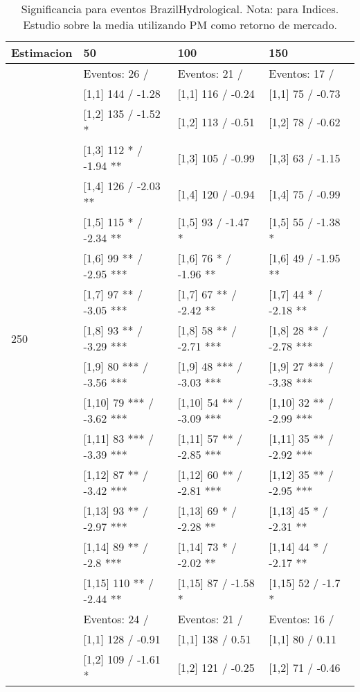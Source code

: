 \begin{table}

\caption{Significancia para eventos BrazilHydrological. Nota: para Indices. Estudio sobre la media utilizando PM como retorno de mercado.}
\centering
\begin{tabular}[t]{llll}
\toprule
Estimacion & 50 & 100 & 150\\
\midrule
 & Eventos:  26 / & Eventos:  21 / & Eventos:  17 /\\
 & {}[1,1] 144  / -1.28 & {}[1,1] 116  / -0.24 & {}[1,1] 75  / -0.73\\
 & {}[1,2] 135  / -1.52 * & {}[1,2] 113  / -0.51 & {}[1,2] 78  / -0.62\\
 & {}[1,3] 112 * / -1.94 ** & {}[1,3] 105  / -0.99 & {}[1,3] 63  / -1.15\\
 & {}[1,4] 126  / -2.03 ** & {}[1,4] 120  / -0.94 & {}[1,4] 75  / -0.99\\
\addlinespace
 & {}[1,5] 115 * / -2.34 ** & {}[1,5] 93  / -1.47 * & {}[1,5] 55  / -1.38 *\\
 & {}[1,6] 99 ** / -2.95 *** & {}[1,6] 76 * / -1.96 ** & {}[1,6] 49  / -1.95 **\\
 & {}[1,7] 97 ** / -3.05 *** & {}[1,7] 67 ** / -2.42 ** & {}[1,7] 44 * / -2.18 **\\
250 & {}[1,8] 93 ** / -3.29 *** & {}[1,8] 58 ** / -2.71 *** & {}[1,8] 28 ** / -2.78 ***\\
 & {}[1,9] 80 *** / -3.56 *** & {}[1,9] 48 *** / -3.03 *** & {}[1,9] 27 *** / -3.38 ***\\
\addlinespace
 & {}[1,10] 79 *** / -3.62 *** & {}[1,10] 54 ** / -3.09 *** & {}[1,10] 32 ** / -2.99 ***\\
 & {}[1,11] 83 *** / -3.39 *** & {}[1,11] 57 ** / -2.85 *** & {}[1,11] 35 ** / -2.92 ***\\
 & {}[1,12] 87 ** / -3.42 *** & {}[1,12] 60 ** / -2.81 *** & {}[1,12] 35 ** / -2.95 ***\\
 & {}[1,13] 93 ** / -2.97 *** & {}[1,13] 69 * / -2.28 ** & {}[1,13] 45 * / -2.31 **\\
 & {}[1,14] 89 ** / -2.8 *** & {}[1,14] 73 * / -2.02 ** & {}[1,14] 44 * / -2.17 **\\
\addlinespace
 & {}[1,15] 110 ** / -2.44 ** & {}[1,15] 87  / -1.58 * & {}[1,15] 52  / -1.7 *\\
 & Eventos:  24 / & Eventos:  21 / & Eventos:  16 /\\
 & {}[1,1] 128  / -0.91 & {}[1,1] 138  / 0.51 & {}[1,1] 80  / 0.11\\
 & {}[1,2] 109  / -1.61 * & {}[1,2] 121  / -0.25 & {}[1,2] 71  / -0.46\\

\end{tabular}
\end{table}
